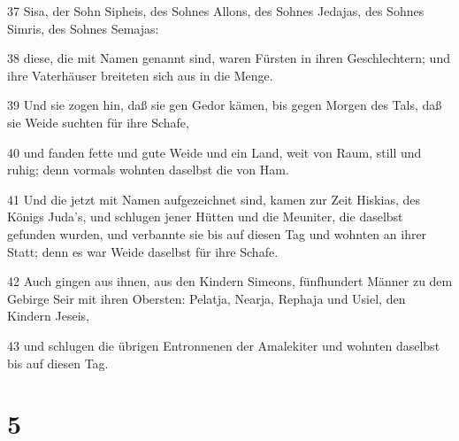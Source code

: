 \par 37 Sisa, der Sohn Sipheis, des Sohnes Allons, des Sohnes Jedajas, des Sohnes Simris, des Sohnes Semajas:
\par 38 diese, die mit Namen genannt sind, waren Fürsten in ihren Geschlechtern; und ihre Vaterhäuser breiteten sich aus in die Menge.
\par 39 Und sie zogen hin, daß sie gen Gedor kämen, bis gegen Morgen des Tals, daß sie Weide suchten für ihre Schafe,
\par 40 und fanden fette und gute Weide und ein Land, weit von Raum, still und ruhig; denn vormals wohnten daselbst die von Ham.
\par 41 Und die jetzt mit Namen aufgezeichnet sind, kamen zur Zeit Hiskias, des Königs Juda's, und schlugen jener Hütten und die Meuniter, die daselbst gefunden wurden, und verbannte sie bis auf diesen Tag und wohnten an ihrer Statt; denn es war Weide daselbst für ihre Schafe.
\par 42 Auch gingen aus ihnen, aus den Kindern Simeons, fünfhundert Männer zu dem Gebirge Seir mit ihren Obersten: Pelatja, Nearja, Rephaja und Usiel, den Kindern Jeseis,
\par 43 und schlugen die übrigen Entronnenen der Amalekiter und wohnten daselbst bis auf diesen Tag.

\chapter{5}

